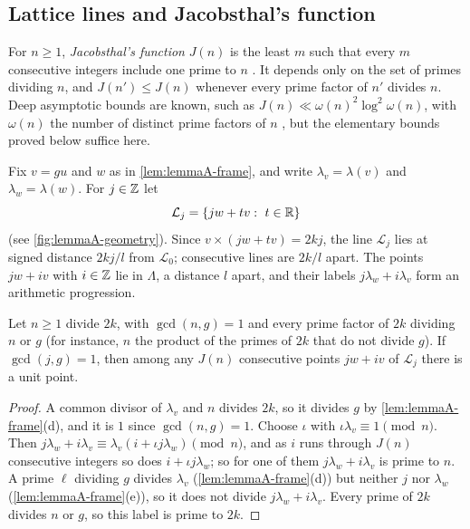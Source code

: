 \subsection{Lattice lines and Jacobsthal's function}
\label{sec:lemmaA-jac}

For $n\ge1$, \emph{Jacobsthal's function} $J(n)$ is the least $m$ such that
every $m$ consecutive integers include one prime to $n$
\citep{Jacobsthal1960a,Jacobsthal1960b,Jacobsthal1960c}. It depends only on
the set of primes dividing $n$, and $J(n')\le J(n)$ whenever every prime
factor of $n'$ divides $n$. Deep asymptotic bounds are known, such as
$J(n)\ll\omega(n)^2\log^2\omega(n)$, with $\omega(n)$ the number of
distinct prime factors of $n$ \citep{Iwaniec1978}, but the elementary bounds
proved below suffice here.

Fix $v=gu$ and $w$ as in \autoref{lem:lemmaA-frame}, and write
$\lambda_v=\lambda(v)$ and $\lambda_w=\lambda(w)$. For $j\in\mathbb{Z}$ let
\[
\mathcal L_j=\{jw+tv:\ t\in\mathbb{R}\}
\]
(see \autoref{fig:lemmaA-geometry}).
Since $v\times(jw+tv)=2kj$, the line $\mathcal L_j$ lies at signed distance
$2kj/l$ from $\mathcal L_0$; consecutive lines are $2k/l$ apart. The points
$jw+iv$ with $i\in\mathbb{Z}$ lie in $\Lambda$, a distance $l$ apart, and their
labels $j\lambda_w+i\lambda_v$ form an arithmetic progression.

\begin{lemma}
\label{lem:lemmaA-line}
Let $n\ge1$ divide $2k$, with $\gcd(n,g)=1$ and every prime factor of $2k$
dividing $n$ or $g$ (for instance, $n$ the product of the primes of $2k$
that do not divide $g$). If $\gcd(j,g)=1$, then among any $J(n)$ consecutive
points $jw+iv$ of $\mathcal L_j$ there is a unit point.
\end{lemma}

\begin{proof}
A common divisor of $\lambda_v$ and $n$ divides $2k$, so it divides $g$ by
\autoref{lem:lemmaA-frame}(d), and it is $1$ since $\gcd(n,g)=1$. Choose
$\iota$ with $\iota\lambda_v\equiv1\pmod n$. Then
$j\lambda_w+i\lambda_v\equiv\lambda_v(i+\iota j\lambda_w)\pmod n$, and as $i$ runs
through $J(n)$ consecutive integers so does $i+\iota j\lambda_w$; so for one
of them $j\lambda_w+i\lambda_v$ is prime to $n$. A prime $\ell$ dividing $g$
divides $\lambda_v$ (\autoref{lem:lemmaA-frame}(d)) but neither $j$ nor
$\lambda_w$ (\autoref{lem:lemmaA-frame}(e)), so it does not divide
$j\lambda_w+i\lambda_v$. Every prime of $2k$ divides $n$ or $g$, so this label is
prime to $2k$.
\end{proof}

